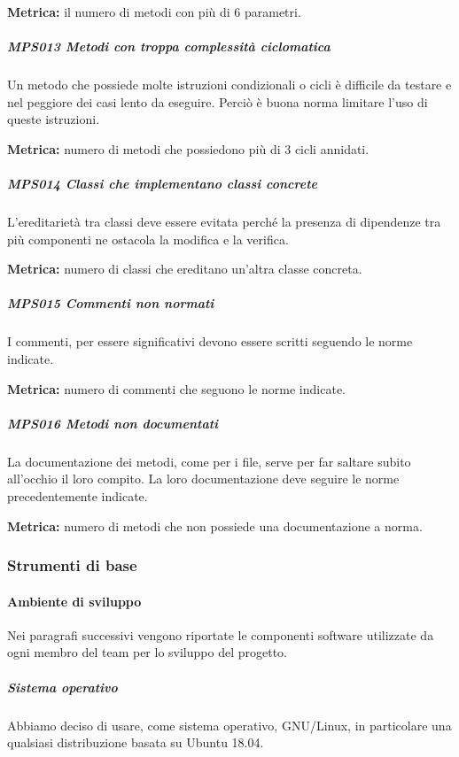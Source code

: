         \textbf{Metrica:} il numero di metodi con più di 6 parametri.

        \subparagraph{MPS013 Metodi con troppa complessità ciclomatica}
        Un metodo che possiede molte istruzioni condizionali o cicli è difficile da testare e nel peggiore dei casi lento da eseguire. Perciò è buona norma limitare l'uso di queste istruzioni.

        \textbf{Metrica:} numero di metodi che possiedono più di 3 cicli annidati.

        \subparagraph{MPS014 Classi che implementano classi concrete}
        L'ereditarietà tra classi deve essere evitata perché la presenza di dipendenze tra più componenti ne ostacola la modifica e la verifica.

        \textbf{Metrica:} numero di classi che ereditano un'altra classe concreta.

        \subparagraph{MPS015 Commenti non normati}
        I commenti, per essere significativi devono essere scritti seguendo le norme indicate.

        \textbf{Metrica:} numero di commenti che seguono le norme indicate.

        \subparagraph{MPS016 Metodi non documentati}
        La documentazione dei metodi, come per i file, serve per far saltare subito all'occhio il loro compito. La loro documentazione deve seguire le norme precedentemente indicate.

        \textbf{Metrica:} numero di metodi che non possiede una documentazione a norma.

        \subsubsection{Strumenti di base}\label{PP:Sviluppo:Strumenti}

	    \paragraph{Ambiente di sviluppo}\label{PP:Sviluppo:Strumenti:AmbienteSviluppo}
	    Nei paragrafi successivi vengono riportate le componenti software utilizzate da ogni membro del team per lo sviluppo del progetto.


	    \subparagraph{Sistema operativo}\label{PP:Sviluppo:Strumenti:AmbienteSviluppo:SistemaOperativo}
	    Abbiamo deciso di usare, come sistema operativo, GNU/Linux, in particolare una qualsiasi distribuzione basata su Ubuntu 18.04.

